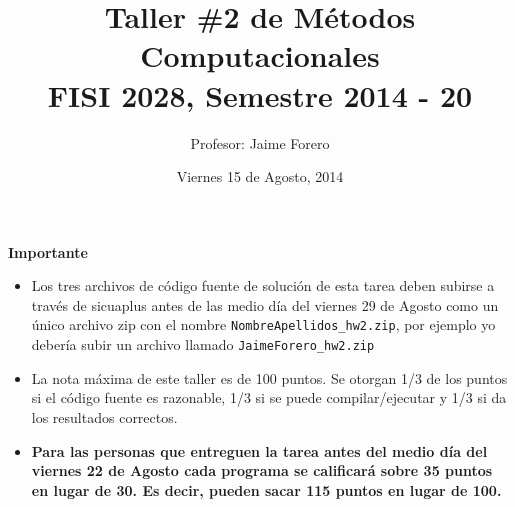 \documentclass{article}
\title{Taller \#2 de M\'etodos Computacionales\\ FISI 2028, Semestre 2014 - 20}
\author{Profesor: Jaime Forero}
\date{Viernes 15 de Agosto, 2014}
\begin{document}
\maketitle
\thispagestyle{empty}


{\bf Importante}
\begin{itemize}

\item Los tres archivos de c\'odigo fuente de soluci\'on de esta tarea
  deben subirse a trav\'es de sicuaplus antes de las medio d\'ia del
  viernes 29 de Agosto como un \'unico archivo zip con el nombre
  \verb"NombreApellidos_hw2.zip", por ejemplo yo deber\'ia subir un
  archivo llamado \verb"JaimeForero_hw2.zip" 

\item La nota m\'axima de este taller es de 100 puntos. Se otorgan 1/3
  de los puntos si el c\'odigo fuente es razonable, 1/3 si se puede
  compilar/ejecutar y 1/3 si da los resultados correctos.  
\item 
{\bf Para las personas que entreguen la tarea antes del medio d\'ia
  del viernes 22 de Agosto cada programa se calificar\'a sobre 35
  puntos en lugar de 30. Es decir, pueden sacar 115 puntos en lugar de
  100.} 
\end{itemize}
\end{document}
